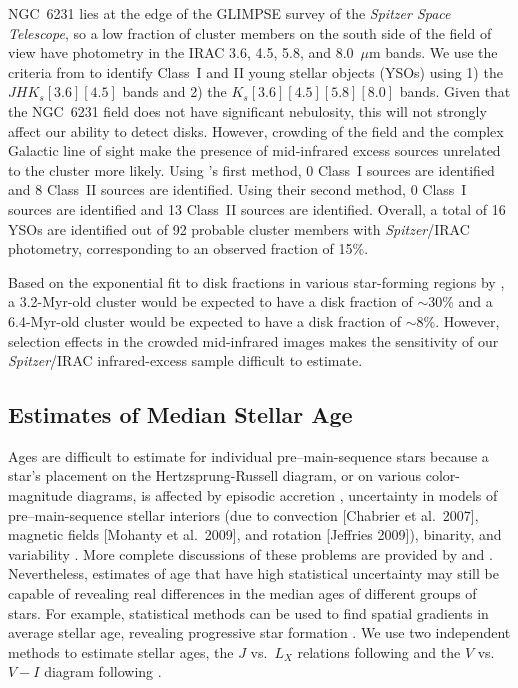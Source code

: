 \documentclass[twocolumn,tighten]{aastex61}
\begin{document}
NGC~6231 lies at the edge of the GLIMPSE survey of the {\it Spitzer Space Telescope}, so a low fraction of cluster members on the south side of the field of view have photometry in the IRAC 3.6, 4.5, 5.8, and 8.0~$\mu$m bands. We use the criteria from \citet{2009ApJS..184...18G} to identify Class~I and II young stellar objects (YSOs) using 1) the $JHK_s[3.6][4.5]$ bands and 2) the $K_s[3.6][4.5][5.8][8.0]$ bands. Given that the NGC~6231 field does not have significant nebulosity, this will not strongly affect our ability to detect disks. However, crowding of the field and the complex Galactic line of sight make the presence of mid-infrared excess sources unrelated to the cluster more likely. Using \citeauthor{2009ApJS..184...18G}'s first method, 0 Class~I sources are identified and 8 Class~II sources are identified. Using their second method, 0 Class~I sources are identified and 13 Class~II sources are identified. Overall, a total of 16 YSOs are identified out of 92 probable cluster members with {\it Spitzer}/IRAC photometry, corresponding to an observed fraction of 15\%.

Based on the exponential fit to disk fractions in various star-forming regions by \citet{2009AIPC.1158....3M}, a 3.2-Myr-old cluster would be expected to have a disk fraction of $\sim$30\% and a 6.4-Myr-old cluster would be expected to have a disk fraction of $\sim$8\%. However, selection effects in the crowded mid-infrared images makes the sensitivity of our {\it Spitzer}/IRAC infrared-excess sample difficult to estimate.

\subsection{Estimates of Median Stellar Age\label{age.sec}}

Ages are difficult to estimate for individual pre--main-sequence stars because a star's placement on the Hertzsprung-Russell diagram, or on various color-magnitude diagrams, is affected by episodic accretion \citep{2009ApJ...702L..27B}, uncertainty in models of pre--main-sequence stellar interiors (due to convection [Chabrier et al.\ 2007], magnetic fields [Mohanty et al.\ 2009], and rotation [Jeffries 2009]), \nocite{2007A&A...472L..17C,2009ApJ...697..713M,2009IAUS..258...95J}
binarity, and variability \citep{2011MNRAS.418.1948J}. More complete discussions of these problems are provided by \citet{2012RAA....12....1P} and \citet{2014ApJ...787..108G}. Nevertheless, estimates of age that have high statistical uncertainty may still be capable of revealing real differences in the median ages of different groups of stars. For example, statistical methods can be used to find spatial gradients in average stellar age, revealing progressive star formation \citep[][]{2009ApJ...699.1454G,2012MNRAS.426.2917G}. We use two independent methods to estimate stellar ages, the $J$ vs.\ $L_X$ relations following \citet{2014ApJ...787..108G} and the $V$ vs.\ $V-I$ diagram following .
\end{document}
